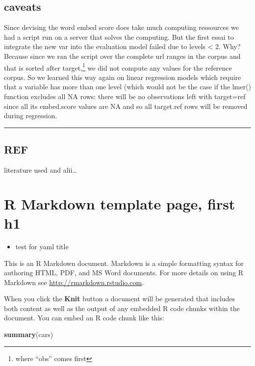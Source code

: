 \documentclass[
]{article}
\newenvironment{Shaded}{\begin{snugshade}}{\end{snugshade}}
\newcommand{\FunctionTok}[1]{\textcolor[rgb]{0.13,0.29,0.53}{\textbf{#1}}}
\newcommand{\NormalTok}[1]{#1}
\providecommand{\tightlist}{%
  \setlength{\itemsep}{0pt}\setlength{\parskip}{0pt}}
\begin{document}
\subsection{caveats}\label{caveats}

Since devising the word embed score does take much computing ressources we had a script run on a server that solves the computing. But the first essai to integrate the new var into the evaluation model failed due to levels \textless{} 2. Why? Because since we ran the script over the complete url ranges in the corpus and that is sorted after target,\footnote{where ``obs'' comes first} we did not compute any values for the reference corpus. So we learned this way again on linear regression models which require that a variable has more than one level (which would not be the case if the lmer() function excludes all NA rows: there will be no observations left with target=ref since all its embed.score values are NA and so all target.ref rows will be removed during regression.

\begin{center}\rule{0.5\linewidth}{0.5pt}\end{center}

\subsection{REF}\label{ref-1}

literature used and alii\ldots{}

\section{R Markdown template page, first h1}\label{r-markdown-template-page-first-h1}

\begin{itemize}
\tightlist
\item
  test for yaml title
\end{itemize}

This is an R Markdown document. Markdown is a simple formatting syntax for authoring HTML, PDF, and MS Word documents. For more details on using R Markdown see \url{http://rmarkdown.rstudio.com}.

When you click the \textbf{Knit} button a document will be generated that includes both content as well as the output of any embedded R code chunks within the document. You can embed an R code chunk like this:

\begin{Shaded}
\begin{Highlighting}[]
\FunctionTok{summary}\NormalTok{(cars)}
\end{Highlighting}
\end{Shaded}
\end{document}
